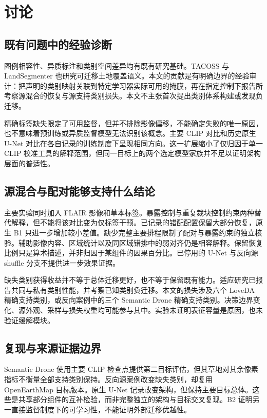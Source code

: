 \section{讨论}
\label{sec:discussion}
\subsection{既有问题中的经验诊断}
图例相容性、异质标注和类别空间差异均有既有研究基础\citep{yang2017harmonization,lambert2020mseg,kim2022uniseg}。TACOSS 与 LandSegmenter 也研究可迁移土地覆盖语义\citep{zermatten2025tacoss,liu2026landsegmenter}。本文的贡献是有明确边界的经验审计：把声明的类别映射关联到特定学习器实际可用的掩膜，再在指定控制下报告所考察源混合的恢复与源支持类别损失。本文不主张首次提出类别体系构建或发现负迁移。

精确标签缺失限定了可用监督，但并不排除影像偏移，不能确定失败的唯一原因，也不意味着预训练或异质监督模型无法识别该概念。主要 CLIP 对比和历史原生 U-Net 对比在各自记录的训练制度下呈现相同方向。这一扩展缩小了仅归因于单一 CLIP 校准工具的解释范围，但同一目标上的两个选定模型家族并不足以证明架构层面的普适性。

\subsection{源混合与配对能够支持什么结论}
主要实验同时加入 FLAIR 影像和草本标签。暴露控制与重复裁块控制约束两种替代解释，但不能将该对比变为仅标签干预。已记录的错配配置保留大部分恢复，原生 B1 只进一步增加较小差值。缺少完整主要排程限制了配对与暴露约束的独立核验。辅助影像内容、区域统计以及同区域错排中的弱对齐仍是相容解释。保留恢复比例只是算术描述，并非归因于某组件的因果百分比。已停用的 U-Net 与反向源 shuffle 分支不提供进一步效果证据。

缺失类别获得收益并不等于总体迁移更好，也不等于保留既有能力。适应研究已报告共同与私有类别性能，并考察已知类别负迁移\citep{choe2024bus,choe2025unida,ren2026sats}。本文的损失涉及六个 LoveDA 精确支持类别，或反向案例中的三个 Semantic Drone 精确支持类别。决策边界变化、源外观、采样与损失权重均可能参与其中。实验未证明表征容量是原因，也未验证缓解模块。

\subsection{复现与来源证据边界}
Semantic Drone 使用主要 CLIP 检查点提供第二目标评估，但其草地对其余像素指标不衡量全部支持类别保持。反向源案例改变缺失类别，却复用 OpenEarthMap 目标版本。原生 U-Net 记录改变架构，但保持主要目标总体。这些是共享部分组件的互补检验，而非完整独立的架构与目标交叉复现。B2 证明另一直接监督制度下的可学习性，不能证明外部迁移优越性。

